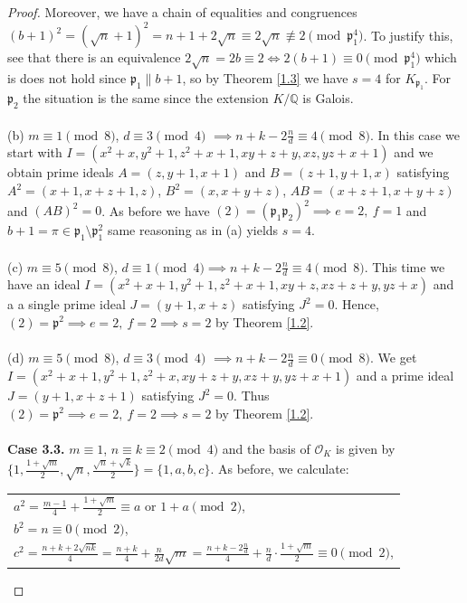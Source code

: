 \documentclass[10pt,a4paper]{amsart}
\begin{document}
\begin{proof}
Moreover, we have a chain of equalities and congruences $(b+1)^2 = (\sqrt{n}+1)^2 = n+1+2\sqrt{n} \equiv 2\sqrt{n} \not\equiv 2 \pmod{\mathfrak{p}_1^4}$. To justify this, see that there is an equivalence $2\sqrt{n} = 2b \equiv 2 \iff 2(b+1) \equiv 0 \pmod{\mathfrak{p}_1^4}$ which is does not hold since $\mathfrak{p}_1 \parallel b+1$, so by Theorem \ref{1.3} we have $s=4$ for $K_{\mathfrak{p}_1}$. For $\mathfrak{p}_2$ the situation is the same since the extension $K/\mathbb{Q}$ is Galois.
\\ \\
(b) $m \equiv 1 \pmod{8}$, $d \equiv 3 \pmod{4}$ $ \implies n+k-2\frac{n}{d} \equiv 4 \pmod{8}$. In this case we start with
$I = (x^2+x,y^2+1,z^2+x+1,xy+z+y,xz,yz+x+1)$ and we obtain prime ideals $A=(z,y+1,x+1)$ and $B = (z+1,y+1,x)$ satisfying $A^2 = (x+1,x+z+1,z)$, $B^2=(x,x+y+z)$, $AB = (x+z+1,x+y+z)$ and $(AB)^2=0$. As before we have $(2) = (\mathfrak{p}_1\mathfrak{p}_2)^2 \implies e=2, \ f=1$ and $b+1 = \pi \in \mathfrak{p}_1\setminus\mathfrak{p}_1^2$ same reasoning as in (a) yields $s=4$.
\\ \\
(c) $m \equiv 5 \pmod{8}$, $d \equiv 1 \pmod{4} \implies n+k-2\frac{n}{d} \equiv 4 \pmod{8}$. This time we have an ideal
$I = (x^2+x+1,y^2+1,z^2+x+1,xy+z,xz+z+y,yz+x)$ and a a single prime ideal $J = (y+1,x+z)$ satisfying $J^2 = 0.$ Hence, $ (2) = \mathfrak{p}^2 \implies e=2, \ f=2 \implies s=2$ by Theorem \ref{1.2}.
\\ \\
(d) $m \equiv 5 \pmod{8}$, $d \equiv 3 \pmod{4}$ $ \implies n+k-2\frac{n}{d} \equiv 0 \pmod{8}$. We get
$I = (x^2+x+1,y^2+1,z^2+x,xy+z+y,xz+y,yz+x+1)$ and a prime ideal $J = (y+1,x+z+1)$ satisfying $J^2 = 0.$ Thus $(2) = \mathfrak{p}^2 \implies e=2,\ f=2 \implies s=2$ by Theorem \ref{1.2}.
\\ \\
\textbf{Case 3.3.}  $m \equiv 1$, $n \equiv k \equiv 2 \pmod{4}$ and the basis of $\mathcal{O}_K$ is given by $\{1, \frac{1+\sqrt{m}}{2}, \sqrt{n}, \frac{\sqrt{n}+\sqrt{k}}{2}\} = \{1,a,b,c\}$.  As before, we calculate:
\begin{center}
\begin{tabular}{@{}l@{}}
$a^2 = \frac{m-1}{4} + \frac{1+\sqrt{m}}{2} \equiv a \text{ or } 1 + a\pmod{2}$, \\
$b^2 = n \equiv 0 \pmod{2}$,\\
$c^2 = \frac{n+k+2\sqrt{nk}}{4} = \frac{n+k}{4} + \frac{n}{2d}\sqrt{m} = \frac{n+k-2\frac{n}{d}}{4} + \frac{n}{d} \cdot \frac{1+\sqrt{m}}{2} \equiv 0 \pmod{2}$,\\


\end{tabular}
\end{center}
\end{proof}
\end{document}
